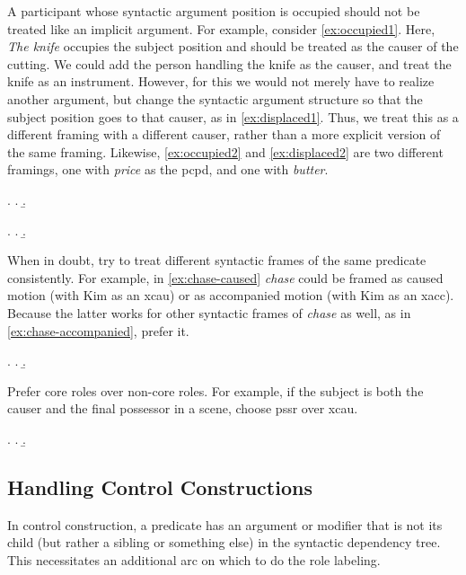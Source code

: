 \documentclass[a4paper]{article}
\begin{document}
A participant whose syntactic argument position is occupied should not be
treated like an implicit argument. For example, consider \ref{ex:occupied1}.
Here, \emph{The knife} occupies the subject position and should be treated as
the causer of the cutting. We could add the person handling the knife as the
causer, and treat the knife as an instrument. However, for this we would not
merely have to realize another argument, but change the syntactic argument
structure so that the subject position goes to that causer, as in
\ref{ex:displaced1}. Thus, we treat this as a different framing with a
different causer, rather than a more explicit version of the same framing.
Likewise, \ref{ex:occupied2} and \ref{ex:displaced2} are two different framings, one with
\emph{price} as the \textsf{pcpd}, and one with \emph{butter}.

\ex.
\a. \label{ex:occupied1} 
\b. \label{ex:displaced1} 

\ex.
\a. \label{ex:occupied2} 
\b. \label{ex:displaced2} 

When in doubt, try to treat different syntactic frames of the same predicate
consistently.  For example, in \ref{ex:chase-caused} \emph{chase} could be
framed as caused motion (with Kim as an \textsf{xcau}) or as accompanied motion
(with Kim as an \textsf{xacc}). Because the latter works for other syntactic
frames of \emph{chase} as well, as in \ref{ex:chase-accompanied}, prefer it.

\ex.
\a. \label{ex:chase-caused} 
\b. \label{ex:chase-accompanied} 

Prefer core roles over non-core roles. For example, if the subject is both the
causer and the final possessor in a scene, choose \textsf{pssr} over
\textsf{xcau}.

\ex. \a. 
     \b. 


\subsection{Handling Control Constructions}

In control construction, a predicate has an argument or modifier that is not
its child (but rather a sibling or something else) in the syntactic dependency
tree. This necessitates an additional arc on which to do the role labeling.
\end{document}
